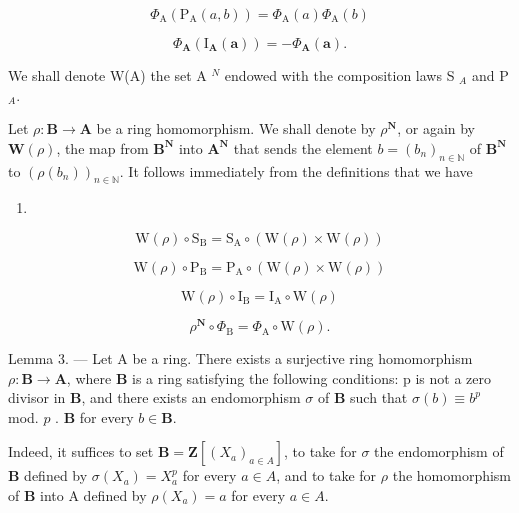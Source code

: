 \[
\Phi_ {\mathrm{A}} (\mathrm{P} _ {\mathrm{A}} (a, b)) = \Phi_ {\mathrm{A}} (a) \Phi_ {\mathrm{A}} (b)\tag{18}
\]

\[
\Phi_ {\mathbf {A}} \left(\mathrm{I} _ {\mathbf {A}} (\boldsymbol {a})\right) = - \Phi_ {\mathbf {A}} (\boldsymbol {a}).
\]

We shall denote W(A) the set A \(^{N}\) endowed with the composition laws S \(_{A}\) and P \(_{A}\).

Let \(\rho : \mathbf{B} \to \mathbf{A}\) be a ring homomorphism. We shall denote by \(\rho^{\mathbf{N}}\), or again by \(\mathbf{W}(\rho)\), the map from \(\mathbf{B}^{\mathbf{N}}\) into \(\mathbf{A}^{\mathbf{N}}\) that sends the element \(b = (b_n)_{n \in \mathbb{N}}\) of \(\mathbf{B}^{\mathbf{N}}\) to \((\rho(b_n))_{n \in \mathbb{N}}\). It follows immediately from the definitions that we have

\begin{enumerate}
\def\labelenumi{(\arabic{enumi})}
\setcounter{enumi}{18}
\tightlist
\item
\end{enumerate}

\[
\mathrm{W} (\rho) \circ \mathrm{S} _ {\mathrm{B}} = \mathrm{S} _ {\mathrm{A}} \circ (\mathrm{W} (\rho) \times \mathrm{W} (\rho))\tag{20}
\]

\[
\mathrm{W} (\rho) \circ \mathrm{P} _ {\mathrm{B}} = \mathrm{P} _ {\mathrm{A}} \circ (\mathrm{W} (\rho) \times \mathrm{W} (\rho))\tag{21}
\]

\[
\mathrm{W} (\rho) \circ \mathrm{I} _ {\mathrm{B}} = \mathrm{I} _ {\mathrm{A}} \circ \mathrm{W} (\rho)\tag{22}
\]

\[
\rho^ {\mathbf {N}} \circ \Phi_ {\mathrm{B}} = \Phi_ {\mathrm{A}} \circ \mathrm{W} (\rho).
\]

Lemma 3. --- Let A be a ring. There exists a surjective ring homomorphism \(\rho: \mathbf{B} \to \mathbf{A}\), where \(\mathbf{B}\) is a ring satisfying the following conditions: p is not a zero divisor in \(\mathbf{B}\), and there exists an endomorphism \(\sigma\) of \(\mathbf{B}\) such that \(\sigma(b) \equiv b^p\) mod. \(p\) . \(\mathbf{B}\) for every \(b \in \mathbf{B}\).

Indeed, it suffices to set \(\mathbf{B} = \mathbf{Z}[(X_{a})_{a \in A}]\), to take for \(\sigma\) the endomorphism of \(\mathbf{B}\) defined by \(\sigma(X_{a}) = X_{a}^{p}\) for every \(a \in A\), and to take for \(\rho\) the homomorphism of \(\mathbf{B}\) into A defined by \(\rho(X_{a}) = a\) for every \(a \in A\).

